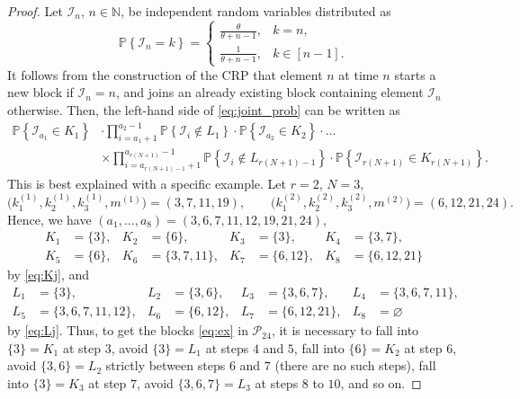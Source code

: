 \documentclass[10pt,a4paper]{amsart}
\newcommand{\Ic}{\mathcal{I}}
\newcommand{\N}{\mathbb{N}}
\newcommand{\Pc}{\mathcal{P}}
\renewcommand{\P}[1]{\mathbb{P}{\left\{#1\right\}}}
\begin{document}
\begin{proof}
		Let $\Ic_n$, $n\in\N$, be independent random variables distributed as
		\begin{equation}
			\label{eq:Idist}
			\P{\Ic_n = k} = \begin{cases}
				\frac{\theta}{\theta + n - 1}, & k = n, \\
				\frac{1}{\theta + n - 1}, & k \in [n-1].
			\end{cases}
		\end{equation}
		It follows from the construction of the CRP that element $n$ at time $n$ starts a new block if $\Ic_n=n$,
		and joins an already existing block containing element $\Ic_n$ otherwise.
		Then, the left-hand side of \eqref{eq:joint_prob} can be written as
		\begin{equation}
			\begin{aligned}
				\label{eq:joint_prob_expanded}
				\P{\Ic_{a_1}\in K_1}&\cdot\!\!\prod_{i={a_1+1}}^{a_2 - 1}\P{\Ic_i \notin L_1}\cdot\P{\Ic_{a_2}\in K_2}\cdot\ldots\\&\times\!\! \prod_{i=a_{r(N+1)-1}+1}^{a_{r(N+1)}-1}\!\!\P{\Ic_i
					\notin L_{r(N+1)-1}}\cdot\P{\Ic_{r(N+1)} \in K_{r(N+1)}}.
			\end{aligned}
		\end{equation}
		This is best explained with a specific example. Let $r=2$, $N=3$,
		\begin{equation}
			\label{eq:ex}
			\bigl(k_1^{(1)},k_2^{(1)},k_3^{(1)},m^{(1)}\bigr) = (3,7,11,19),\qquad
			\bigl(k_1^{(2)},k_2^{(2)},k_3^{(2)},m^{(2)}\bigr) = (6,12,21,24).
		\end{equation}
		Hence, we have $(a_1,\ldots,a_8)=(3,6,7,11,12,19,21,24)$,
		\begin{equation*}
			\begin{aligned}
				K_1 &= \{3\}, & K_2 &= \{6\}, & K_3 &= \{3\}, & K_4 &= \{3,7\}, \\
				K_5 &= \{6\}, & K_6 &= \{3,7,11\}, & K_7 &= \{6,12\}, & K_8 &= \{6,12,21\}
			\end{aligned}
		\end{equation*}
		by \eqref{eq:Kj}, and
		\begin{equation*}
			\begin{aligned}
				L_1 &= \{3\}, & L_2 &= \{3,6\}, & L_3 &= \{3,6,7\}, & L_4 &= \{3,6,7,11\}, \\
				L_5 &= \{3,6,7,11,12\}, & L_6 &= \{6,12\}, & L_7 &= \{6,12,21\}, & L_8 &= \varnothing
			\end{aligned}
		\end{equation*}
		by \eqref{eq:Lj}.
		Thus, to get the blocks \eqref{eq:ex} in $\Pc_{24}$, it is necessary to fall into $\{3\} = K_1$ at step $3$,
		avoid $\{3\} = L_1$ at steps $4$ and $5$, fall into $\{6\} = K_2$ at step $6$, avoid $\{3,6\} = L_2$
		strictly between steps $6$ and $7$ (there are no such steps), fall into $\{3\} = K_3$ at step $7$,
		avoid $\{3,6,7\}=L_3$ at steps $8$ to $10$, and so on.    
		

\end{proof}
\end{document}
